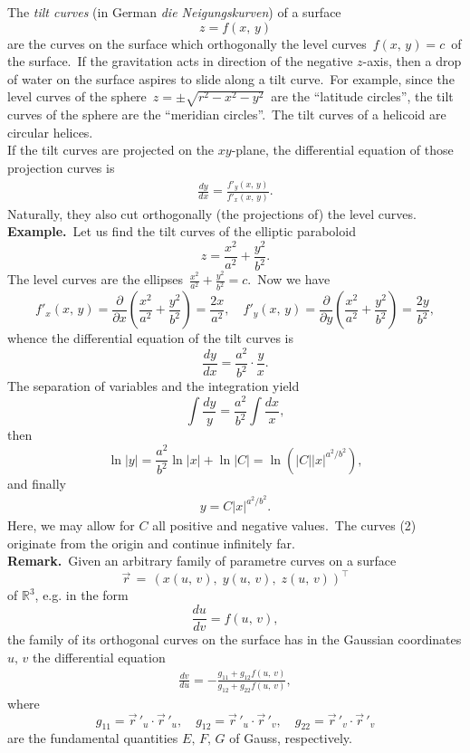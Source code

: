 \documentclass[12pt]{article}
\theoremstyle{definition}
\begin{document}
The {\em tilt curves} (in German {\em die Neigungskurven}) of a surface
                          $$z = f(x,\,y)$$
are the curves on the surface which  orthogonally the level curves \,$f(x,\,y) = c$\, of the surface.\, If the gravitation acts in direction of the negative $z$-axis, then a drop of water on the surface aspires to slide along a tilt curve.\, For example, since the level curves of the sphere \,$z = \pm\sqrt{r^2-x^2-y^2}$\, are the ``latitude circles'', the tilt curves of the sphere are the ``meridian circles''.\, The tilt curves of a helicoid are circular helices.\\

If the tilt curves are projected on the $xy$-plane, the differential equation of those projection curves is
\begin{align}
\frac{dy}{dx} = \frac{f'_y(x,\,y)}{f'_x(x,\,y)}.
\end{align}
Naturally, they also cut orthogonally (the projections of) the level curves.\\

\textbf{Example.}\, Let us find the tilt curves of the elliptic paraboloid
$$z = \frac{x^2}{a^2}+\frac{y^2}{b^2}.$$
The level curves are the ellipses \,$\frac{x^2}{a^2}+\frac{y^2}{b^2} = c$.\, Now we have
$$f'_x(x,\,y) = \frac{\partial}{\partial x}\!\left(\frac{x^2}{a^2}\!+\!\frac{y^2}{b^2}\right) = \frac{2x}{a^2}, \quad
  f'_y(x,\,y) = \frac{\partial}{\partial y}\!\left(\frac{x^2}{a^2}\!+\!\frac{y^2}{b^2}\right) = \frac{2y}{b^2},$$
whence the differential equation of the tilt curves is
$$\frac{dy}{dx} = \frac{a^2}{b^2}\!\cdot\!\frac{y}{x}.$$
The separation of variables and the integration yield
$$\int\frac{dy}{y} = \frac{a^2}{b^2}\!\int\frac{dx}{x},$$
then
$$\ln|y| = \frac{a^2}{b^2}\ln|x|+\ln|C| = \ln(|C||x|^{a^2/b^2}),$$
and finally
\begin{align}
y = C|x|^{a^2/b^2}.
\end{align}
Here, we may allow for $C$ all positive and negative values.\, The curves (2) originate from the origin and continue infinitely far.\\


\textbf{Remark.}\, Given an arbitrary family of parametre curves on a surface 
             $$\vec{r} \,=\, (x(u,\,v),\;y(u,\,v),\;z(u,\,v))^\intercal$$
of $\mathbb{R}^3$, e.g. in the form
                     $$\frac{du}{dv} = f(u,\,v),$$
the family of its orthogonal curves on the surface has in the Gaussian coordinates $u,\,v$ the differential equation
\begin{align}
\frac{dv}{du} = -\frac{g_{11}+g_{12}f(u,\,v)}{g_{12}+g_{22}f(u,\,v)},
\end{align}
where 
$$g_{11} = \vec{r}\,'_u\cdot\vec{r}\,'_u, \quad g_{12} = \vec{r}\,'_u\cdot\vec{r}\,'_v, \quad 
  g_{22} = \vec{r}\,'_v\cdot\vec{r}\,'_v$$
are the  fundamental quantities $E,\,F,\,G$ of Gauss, respectively.



\end{document}

